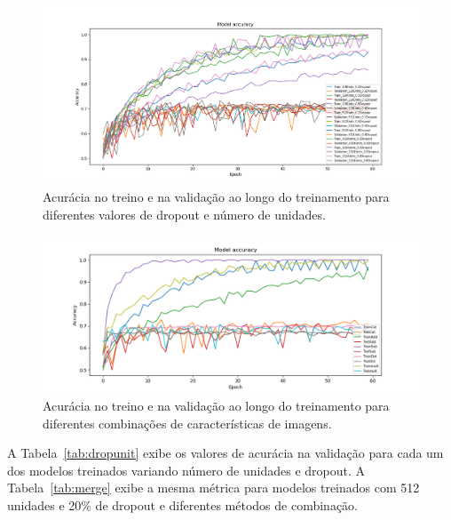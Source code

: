 \documentclass{bmvc2k}
\begin{document}
\begin{figure}[htb]
\centering
    \centering
    \includegraphics[width=\textwidth]{figs/curve.png}
    \caption{Acurácia no treino e na validação ao longo do treinamento para diferentes valores de dropout e número de unidades.}
    \label{fig:curve}
\end{figure}

\begin{figure}[htb]
    \centering
    \includegraphics[width=\textwidth]{figs/curve_merge.png}
    \caption{Acurácia no treino e na validação ao longo do treinamento para diferentes combinações de características de imagens.}
    \label{fig:merge}
\end{figure}

A Tabela~\ref{tab:dropunit} exibe os valores de acurácia na validação para cada um dos modelos treinados variando número de unidades e dropout. A Tabela~\ref{tab:merge} exibe a mesma métrica para modelos treinados com 512 unidades e 20\% de dropout e diferentes métodos de combinação.
\end{document}
